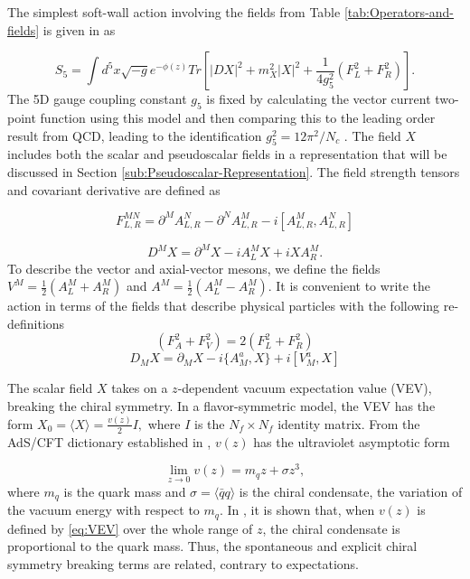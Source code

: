 The simplest soft-wall action involving the fields from Table \ref{tab:Operators-and-fields}
is given in \cite{karch-katz-son-adsqcd} as 

\begin{equation}
S_{5}=\int d^{5}x\sqrt{-g}e^{-\phi(z)}Tr\left[|DX|^{2}+m_{X}^{2}|X|^{2}+\frac{1}{4g_{5}^{2}}(F_{L}^{2}+F_{R}^{2})\right].
\end{equation}
The 5D gauge coupling constant $g_{5}$ is fixed by calculating the vector current two-point function using this model and then comparing this to the leading order result from QCD, leading to the identification $g_{5}^{2}=12\pi^{2}/N_{c}$ \cite{stephanov-katz-son}. 
The field $X$ includes both the scalar and pseudoscalar fields in a representation that will be discussed in Section \ref{sub:Pseudoscalar-Representation}.
The field strength tensors and covariant derivative are defined as

\[
F_{L,R}^{MN}=\partial^{M}A_{L,R}^{N}-\partial^{N}A_{L,R}^{M}-i[A_{L,R}^{M},A_{L,R}^{N}]
\]


\[
D^{M}X=\partial^{M}X-iA_{L}^{M}X+iXA_{R}^{M}.
\]
To describe the vector and axial-vector mesons, we define the fields $V^{M}=\frac{1}{2}(A_{L}^{M}+A_{R}^{M})$ and $A^{M}=\frac{1}{2}(A_{L}^{M}-A_{R}^{M})$.
It is convenient to write the action in terms of the fields that describe physical particles with the following re-definitions
\begin{equation}
(F_{A}^{2}+F_{V}^{2})=2(F_{L}^{2}+F_{R}^{2})
\end{equation}
\begin{equation}
D_{M}X=\partial_{M}X-i\{A_{M}^{a},X\}+i[V_{M}^{a},X]\label{eq:covariant_der}
\end{equation}


The scalar field $X$ takes on a $z$-dependent vacuum expectation value (VEV), breaking the chiral symmetry. 
In a flavor-symmetric model, the VEV has the form $X_{0}=\langle X\rangle=\frac{v(z)}{2}I,$ where $I$ is the $N_{f}\times N_{f}$ identity matrix. 
From the AdS/CFT dictionary established in \cite{maldacena,klebanov-witten}, $v(z)$
has the ultraviolet asymptotic form

\begin{equation}
\lim_{z\rightarrow0}v(z)=m_{q}z+\sigma z^{3},\label{eq:VEV}
\end{equation}
where $m_{q}$ is the quark mass and $\sigma=\langle\bar{q}q\rangle$ is the chiral condensate, the variation of the vacuum energy with respect to $m_{q}$. 
In \cite{karch-katz-son-adsqcd}, it is shown that, when $v(z)$ is defined by \eqref{eq:VEV} over the whole range of $z$, the chiral condensate is proportional to the quark mass.
Thus, the spontaneous and explicit chiral symmetry breaking terms are related, contrary to expectations.

